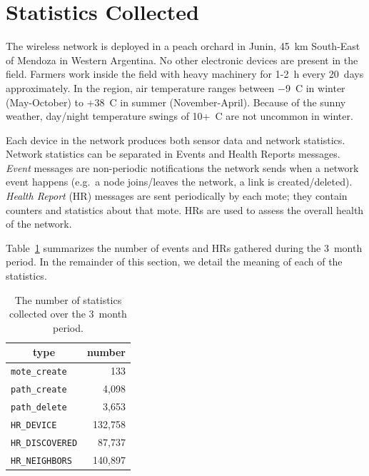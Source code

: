 \documentclass{sig-alternate}
\newcommand{\HRNEIGHBORS}         {{\tt HR\_NEIGHBORS}\xspace}
\newcommand{\HRDISCOVERED}        {{\tt HR\_DISCOVERED}\xspace}
\newcommand{\HRDEVICE}            {{\tt HR\_DEVICE}\xspace}
\newcommand{\pathcreate}          {{\tt path\_create}\xspace}
\newcommand{\pathdelete}          {{\tt path\_delete}\xspace}
\newcommand{\motecreate}          {{\tt mote\_create}\xspace}
\newcommand{\NUMHRNEIGHBORS}      {140,897\xspace}
\begin{document}
\section{Statistics Collected}
\label{sec:collected}


The wireless network is deployed in a peach orchard in Junin, 45~km South-East of Mendoza in Western Argentina.
No other electronic devices are present in the field.
Farmers work inside the field with heavy machinery for 1-2~h every 20~days approximately.
In the region, air temperature ranges between $-$9~C in winter (May-October) to +38~C in summer (November-April).
Because of the sunny weather, day/night temperature swings of 10+~C are not uncommon in winter.


Each device in the network produces both sensor data and network statistics.
Network statistics can be separated in Events and Health Reports messages.
\textit{Event} messages are non-periodic notifications the network sends when a network event happens (e.g.~a node joins/leaves the network, a link is created/deleted).
\textit{Health Report} (HR) messages are sent periodically by each mote; they contain counters and statistics about that mote.
HRs are used to assess the overall health of the network.


Table~\ref{tab:msg_stats} summarizes the number of events and HRs gathered during the 3~month period.
In the remainder of this section, we detail the meaning of each of the statistics.

\begin{table}
    \centering
    \begin{tabular}{|l|r|}
        \hline
        \multicolumn{1}{|c|}{type} & \multicolumn{1}{|c|}{number} \\ \hline
        \hline
        \motecreate     &     133         \\ \hline
        \pathcreate     &   4,098         \\ \hline
        \pathdelete     &   3,653         \\ \hline
        \HRDEVICE       & 132,758         \\ \hline
        \HRDISCOVERED   &  87,737         \\ \hline
        \HRNEIGHBORS    & \NUMHRNEIGHBORS \\ \hline
    \end{tabular}
    \caption{The number of statistics collected over the 3~month period.}
    \label{tab:msg_stats}
\end{table}
\end{document}
